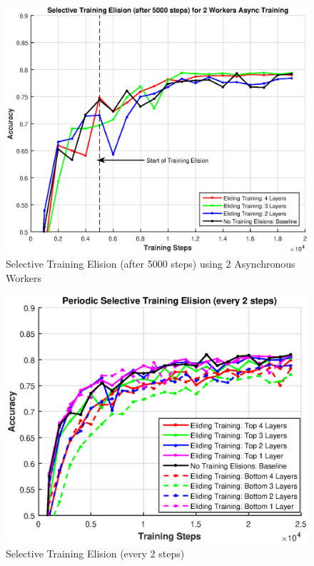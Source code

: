 \begin{figure}[t]
	\centering
	\includegraphics[width=0.8\columnwidth]{figures/approx-2workers.eps}
	\caption{Selective Training Elision (after 5000 steps) using 2 Asynchronous Workers}
	\label{fig:approx-2-workers}
\end{figure}

\begin{figure}[t]
	\centering
	\includegraphics[width=0.8\columnwidth]{figures/combined_bottom_top_elisions.eps}
	\caption{Selective Training Elision (every 2 steps)}
	\label{fig:combined-alt}
\end{figure}
